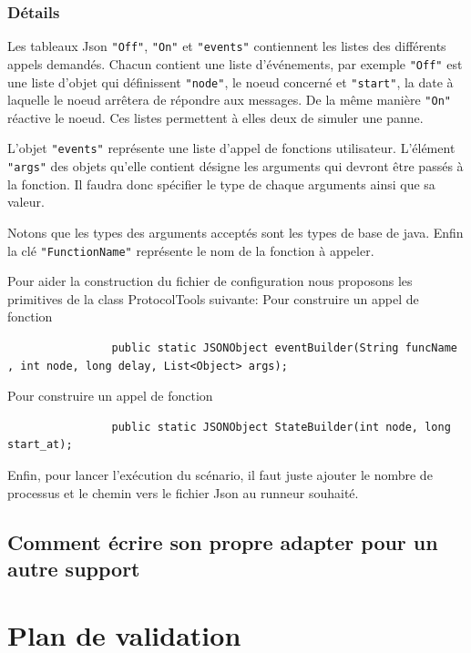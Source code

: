 \documentclass{article}
\begin{document}
			\subsubsection{Détails}
			Les tableaux Json \lstinline{"Off"}, \lstinline{"On"} et \lstinline{"events"} contiennent
			les listes des différents appels demandés.
			Chacun contient une liste d'événements, par exemple \lstinline{"Off"} est une liste
			d'objet qui définissent \lstinline{"node"}, le noeud concerné et \lstinline{"start"}, la
			date à laquelle le noeud arrêtera de répondre aux messages.
			De la même manière \lstinline{"On"} réactive le noeud. Ces listes permettent à elles
			deux de simuler une panne.
			\bigskip

			L'objet \lstinline{"events"} représente une liste d'appel de fonctions utilisateur.
			L'élément \lstinline{"args"} des objets qu'elle contient désigne les arguments qui
			devront être passés à la fonction. Il faudra donc spécifier le type de chaque arguments
			ainsi que sa valeur.

			Notons que les types des arguments acceptés sont les types de base de java.
			Enfin la clé \lstinline{"FunctionName"} représente le nom de la fonction à appeler.
			\bigskip

			Pour aider la construction du fichier de configuration nous proposons les primitives de la class ProtocolTools suivante:
			\newline
			Pour construire un appel de fonction
			\begin{lstlisting}
				public static JSONObject eventBuilder(String funcName , int node, long delay, List<Object> args);
			\end{lstlisting}
			Pour construire un appel de fonction
			\begin{lstlisting}
				public static JSONObject StateBuilder(int node, long start_at);
			\end{lstlisting}

			Enfin, pour lancer l'exécution du scénario, il faut juste ajouter le nombre de processus et le chemin vers le fichier Json au runneur souhaité.
		\subsection{Comment écrire son propre adapter pour un autre support}

		\newpage
		\section{Plan de validation}
\end{document}

